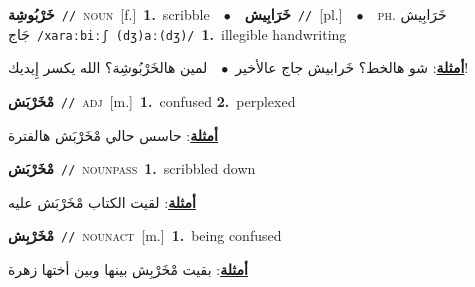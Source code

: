 \documentclass[10pt,a4paper,twoside]{article} %
\begin{document}
\begin{multicols}{2}
{\setlength\topsep{0pt}\textbf{\foreignlanguage{arabic}{خَرْبُوشِة}}\ {\color{gray}\texttt{//}\color{black}}\ \textsc{noun}\ [f.]\ \textbf{1.}~scribble\ \ $\bullet$\ \ \setlength\topsep{0pt}\textbf{\foreignlanguage{arabic}{خَرَابِيش}}\ {\color{gray}\texttt{//}\color{black}}\ [pl.]\ \ $\bullet$\ \ \textsc{ph.} \color{gray} \foreignlanguage{arabic}{خَرَابِيش جَاج}\color{black}\ {\color{gray}\texttt{/{\sffamily xaraːbiːʃ (dʒ)aː(dʒ)}/}\color{black}}\ \textbf{1.}~illegible handwriting\  \begin{flushright}\color{gray}\foreignlanguage{arabic}{\textbf{\underline{\foreignlanguage{arabic}{أمثلة}}}: شو هالخط؟ خَرابيش جاج عالأخير\ $\bullet$\ \  لمين هالخَرْبُوشِة؟ الله يكسر إِيديك!}\end{flushright}\color{black}} \vspace{2mm}

{\setlength\topsep{0pt}\textbf{\foreignlanguage{arabic}{مْخَرْبَش}}\ {\color{gray}\texttt{//}\color{black}}\ \textsc{adj}\ [m.]\ \textbf{1.}~confused  \textbf{2.}~perplexed\  \begin{flushright}\color{gray}\foreignlanguage{arabic}{\textbf{\underline{\foreignlanguage{arabic}{أمثلة}}}: حاسس حالي مْخَرْبَش هالفترة}\end{flushright}\color{black}} \vspace{2mm}

{\setlength\topsep{0pt}\textbf{\foreignlanguage{arabic}{مْخَرْبَش}}\ {\color{gray}\texttt{//}\color{black}}\ \textsc{noun\textunderscore pass}\ \textbf{1.}~scribbled down\  \begin{flushright}\color{gray}\foreignlanguage{arabic}{\textbf{\underline{\foreignlanguage{arabic}{أمثلة}}}: لقيت الكتاب مْخَرْبَش عليه}\end{flushright}\color{black}} \vspace{2mm}

{\setlength\topsep{0pt}\textbf{\foreignlanguage{arabic}{مْخَرْبِش}}\ {\color{gray}\texttt{//}\color{black}}\ \textsc{noun\textunderscore act}\ [m.]\ \textbf{1.}~being confused\  \begin{flushright}\color{gray}\foreignlanguage{arabic}{\textbf{\underline{\foreignlanguage{arabic}{أمثلة}}}: بقيت مْخَرْبِش بينها وبين أختها زهرة}\end{flushright}\color{black}} \vspace{2mm}


\end{multicols}
\end{document}
